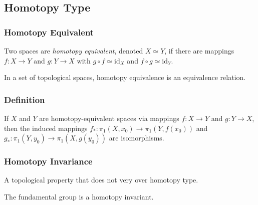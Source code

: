 \subsection{Homotopy Type}

\subsubsection{Homotopy Equivalent}\label{homotopyequivalent}
Two spaces are \emph{homotopy equivalent}, denoted $X \simeq Y$, if there are mappings $f : X \rightarrow Y$ and
$g : Y \rightarrow X$ with $g \circ f \simeq \textrm{id}_X$ and $f \circ g \simeq \textrm{id}_Y$.

\begin{proposition}
In a set of topological spaces, homotopy equivalence is an equivalence relation.
\end{proposition}

\subsubsection{Definition}\label{homotopytype}

\begin{proposition}
If $X$ and $Y$ are homotopy-equivalent spaces via mappings $f : X \rightarrow Y$ and $g : Y \rightarrow X$, then
the induced mappings $f_* : \pi_1(X, x_0) \rightarrow \pi_1(Y, f(x_0))$ and $g_* : \pi_1(Y, y_0) \rightarrow \pi_1(X, g(y_0))$
are isomorphisms.
\end{proposition}

\subsubsection{Homotopy Invariance}\label{homotopyinvariance}
A topological property that does not very over homotopy type.\newline

\noindent The fundamental group is a homotopy invariant.
